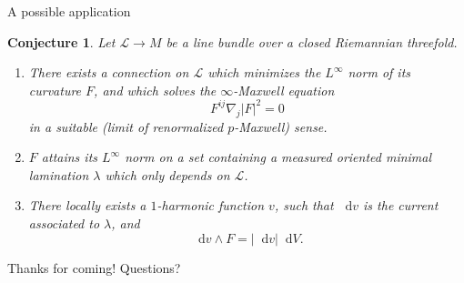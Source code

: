 \documentclass[10pt]{beamer}
\newcommand*\dif{\mathop{}\!\mathrm{d}}
\newtheorem{conjecture}{Conjecture}
\begin{document}
\begin{frame}{A possible application}
    
\begin{conjecture}
    Let $\mathscr L \to M$ be a line bundle over a closed Riemannian threefold.
    \begin{enumerate}
    \item There exists a connection on $\mathscr L$ which minimizes the $L^\infty$ norm of its curvature $F$, and which solves the $\infty$-Maxwell equation 
    $$F^{ij} \nabla_j |F|^2 = 0$$
    in a suitable (limit of renormalized $p$-Maxwell) sense.
    \item $F$ attains its $L^\infty$ norm on a set containing a measured oriented minimal lamination $\lambda$ which only depends on $\mathscr L$.
    \item There locally exists a $1$-harmonic function $v$, such that $\dif v$ is the current associated to $\lambda$, and 
    $$\dif v \wedge F = |\dif v| \dif V.$$
    \end{enumerate}
    \end{conjecture}
\end{frame}

\begin{frame}{Thanks for coming!}
    Questions?
\end{frame}
\end{document}
